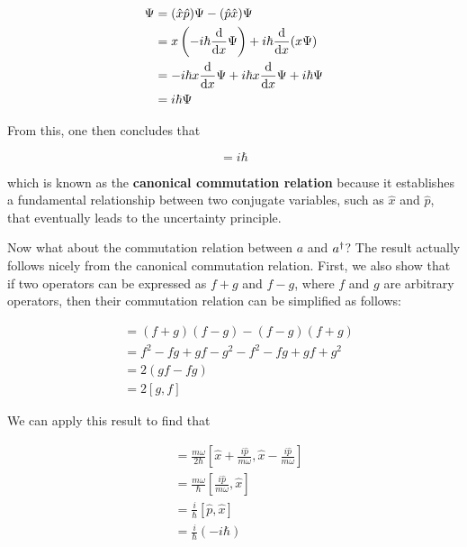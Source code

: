 \begin{align*}
	[\hat{x}, \hat{p}]\Psi &= (\hat{x}\hat{p})\Psi - (\hat{p}\hat{x})\Psi \\
	&= x\left(-i\hbar \dv{x}\Psi \right) + i\hbar \dv{x}(x\Psi) \\
	&= -i\hbar x \dv{x}\Psi + i\hbar x \dv{x}\Psi + i\hbar\Psi \\
	&= i\hbar\Psi 
\end{align*}

From this, one then concludes that 

\begin{tcolorbox}[title = Canonical commutation relation] \vspace{-2ex}
	\begin{equation}
		[\hat{x}, \hat{p}] = i\hbar
	\end{equation}
\end{tcolorbox}

\noindent which is known as the \textbf{canonical commutation relation} because it establishes a fundamental relationship between two conjugate variables, such as $\hat{x}$ and $\hat{p}$, that eventually leads to the uncertainty principle. 

Now what about the commutation relation between $a$ and $a^{\dagger}$? 
The result actually follows nicely from the canonical commutation relation. 
First, we also show that if two operators can be expressed as $f+g$ and $f-g$, where $f$ and $g$ are arbitrary operators, then their commutation relation can be simplified as follows:

\begin{align*}
	[f+g,f-g] &= (f+g)(f-g) - (f-g)(f+g) \\
	&= f^2 - fg + gf -g^2 - f^2 - fg + gf + g^2 \\
	&= 2(gf - fg) \\
	&= 2[g,f]
\end{align*}

We can apply this result to find that

\begin{align*}
	[a, \ad] &= \frac{m\omega}{2\hbar}\left[\hat{x} + \frac{i\hat{p}}{m\omega}, \hat{x} - \frac{i\hat{p}}{m\omega} \right] \\
	&= \frac{m\omega}{\hbar} \left[ \frac{i\hat{p}}{m\omega}, \hat{x} \right] \\
	&= \frac{i}{\hbar}[\hat{p},\hat{x}] \\
	&= \frac{i}{\hbar}(-i\hbar) 
\end{align*}

